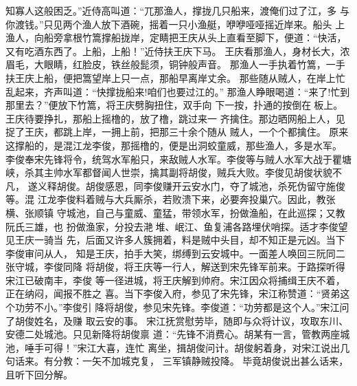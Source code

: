 知寡人这般困乏。”近侍高叫道：“兀那渔人，撑拢几只船来，渡俺们过了江，多
与你渡钱。”只见两个渔人放下酒碗，摇着一只小渔艇，咿咿哑哑摇近岸来。船头
上渔人，向船旁拿根竹篙撑船拢岸，定睛把王庆从头上直看至脚下，便道：“快活，
又有吃酒东西了。上船，上船！”近侍扶王庆下马。
王庆看那渔人，身材长大，浓眉毛，大眼睛，红脸皮，铁丝般髭须，铜钟般声音。
那渔人一手执着竹篙，一手扶王庆上船，便把篙望岸上只一点，那船早离岸丈余。
那些随从贼人，在岸上忙乱起来，齐声叫道：“快撑拢船来!咱们也要过江的。”
那渔人睁眼喝道：“来了!忙到那里去？”便放下竹篙，将王庆劈胸扭住，双手向
下一按，扑通的按倒在板上。王庆待要挣扎，那船上摇橹的，放了橹，跳过来一
齐擒住。那边晒网船上人，见捉了王庆，都跳上岸，一拥上前，把那三十余个随从
贼人，一个个都擒住。
原来这撑船的，是混江龙李俊，那摇橹的，便是出洞蛟童威，那些渔人，多是水军。
李俊奉宋先锋将令，统驾水军船只，来敌贼人水军。李俊等与贼人水军大战于瞿塘
峡，杀其主帅水军都督闻人世崇，擒其副将胡俊，贼兵大败。李俊见胡俊状貌不凡，
遂义释胡俊。胡俊感恩，同李俊赚开云安水门，夺了城池，杀死伪留守施俊等。混
江龙李俊料着贼与大兵厮杀，若败溃下来，必要奔投巢穴。因此，教张横、张顺镇
守城池，自己与童威、童猛，带领水军，扮做渔船，在此巡探；又教阮氏三雄，也
扮做渔家，分投去滟堆、岷江、鱼复浦各路埋伏哨探。适才李俊望见王庆一骑当
先，后面又许多人簇拥着，料是贼中头目，却不知正是元凶。当下李俊审问从人，
知是王庆，拍手大笑，绑缚到云安城中。一面差人唤回三阮同二张守城，李俊同降
将胡俊，将王庆等一行人，解送到宋先锋军前来。于路探听得宋江已破南丰，李俊
等一径进城，将王庆解到帅府。宋江因众将捕缉王庆不着，正在纳闷，闻报不胜之
喜。当下李俊入府，参见了宋先锋，宋江称赞道：“贤弟这个功劳不小。”李俊引
降将胡俊，参见宋先锋。李俊道：“功劳都是这个人。”宋江问了胡俊姓名，及赚
取云安的事。
宋江抚赏慰劳毕，随即与众将计议，攻取东川、安德二处城池。只见新降将胡俊禀
道：“先锋不消费心。胡某有一言，管教两座城池，唾手可得！”宋江大喜，连忙
离坐，揖胡俊问计。胡俊躬着身，对宋江说出几句话来。有分教：一矢不加城克复，
三军镇静贼投降。
毕竟胡俊说出甚么话来，且听下回分解。